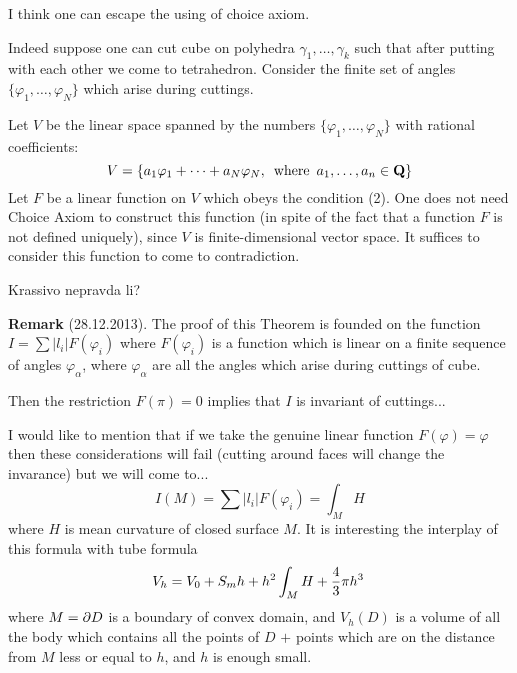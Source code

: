   I think one can escape the using of choice axiom.

\m


 Indeed  suppose one can cut cube on polyhedra $\gamma_1,\dots,\gamma_k$
  such that after putting with each other we come to tetrahedron.
   Consider the finite set of angles $\{\varphi_1,\dots,\varphi_N\}$
   which arise during cuttings.

   Let $V$ be the linear space spanned by the numbers $\{\varphi_1,\dots,\varphi_N\}$ with rational coefficients:
              $$
      V=\{a_1\varphi_1+\dots+a_N\varphi_N,\,\,\,{\rm where}\,\,\, a_1,\dots,a_n\in {\bf Q}\}
              $$
 Let $F$ be a linear function on $V$ which obeys the condition (2). One does not need Choice Axiom to
 construct this function (in spite of the fact that a function $F$ is not defined uniquely),
 since  $V$ is finite-dimensional vector space.
It  suffices to consider this function to come to contradiction.

   Krassivo nepravda li?


\medskip

{\bf Remark} (28.12.2013).
  The proof of this Theorem is founded on the function
  $I=\sum |l_i|F(\varphi_i)$ where $F(\varphi_i)$ is a function which is
linear on a finite sequence of angles $\varphi_\alpha$, where
$\varphi_\alpha$ are all the angles which arise during cuttings of cube.

  Then the restriction $F(\pi)=0$ implies that $I$ is invariant of cuttings...

  I would like to mention that if we take the genuine linear function 
$F(\varphi)=\varphi$ then these considerations will fail (cutting around faces
will change the invarance) but we will come to...
                 $$
     I(M)=\sum |l_i|F(\varphi_i)=\int_M H
                 $$
where $H$ is mean curvature of closed surface $M$. It is interesting the
interplay of this formula with tube formula
       $$
  V_h=V_0+S_mh+h^2\int_M H+{4\over 3}\pi h^3\,
       $$
where $M=\partial D$ is a boundary of convex domain, and $V_h(D)$ is a 
volume of all the body which contains all the points of $D$ $+$ points
which are on the distance from $M$ less or equal to $h$,
and $h$ is enough small.



    \bye

